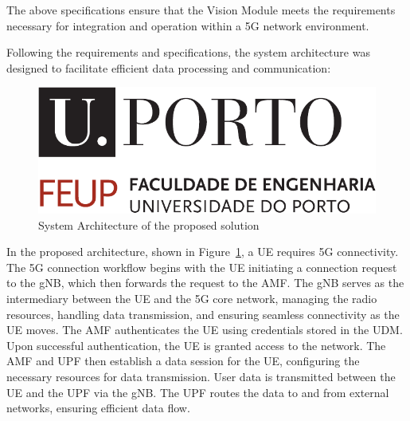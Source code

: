 \begin{table}[H]
\caption{Specifications}
\label{tab:spec}
\centering
{}
\end{table}

The above specifications ensure that the Vision Module meets the requirements necessary for integration and operation within a 5G network environment.


Following the requirements and specifications, the system architecture was designed to facilitate efficient data processing and communication:

\begin{figure}[H]
    \centering
    \includegraphics[width=0.5\linewidth]{figures/uporto-feup}
    \caption[System Architecture of the proposed solution]{System Architecture of the proposed solution}
    \label{fig:my_arch}
\end{figure}

In the proposed architecture, shown in Figure~\ref{fig:my_arch}, a UE requires 5G connectivity.
The 5G connection workflow begins with the UE initiating a connection request to the gNB, which then forwards the request to the AMF\@.
The gNB serves as the intermediary between the UE and the 5G core network, managing the radio resources, handling data transmission, and ensuring seamless connectivity as the UE moves.
The AMF authenticates the UE using credentials stored in the UDM. Upon successful authentication, the UE is granted access to the network.
The AMF and UPF then establish a data session for the UE, configuring the necessary resources for data transmission.
User data is transmitted between the UE and the UPF via the gNB\@.
The UPF routes the data to and from external networks, ensuring efficient data flow.

